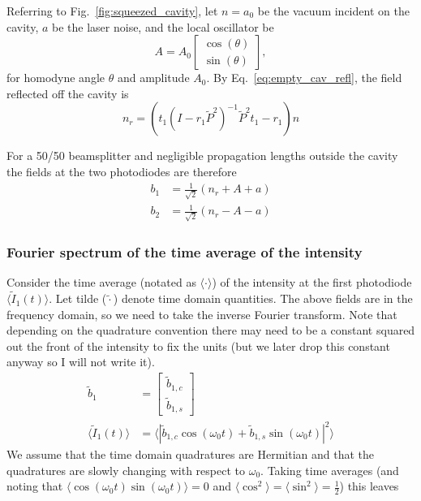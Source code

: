 \documentclass[aps,pra,superscriptaddress,reprint,nofootinbib]{revtex4-1}
\newcommand{\abs}[1]{\left\lvert #1 \right\rvert}
\newcommand{\expect}[1]{\langle #1 \rangle}
\begin{document}
Referring to Fig.~\ref{fig:squeezed_cavity}, let $n = a_0$ be the vacuum incident on the cavity, $a$ be the laser noise, and the local oscillator be
\begin{equation}
A = A_0 \begin{bmatrix}
\cos(\theta)\\ 
\sin(\theta)
\end{bmatrix},
\end{equation}
for homodyne angle $\theta$ and amplitude $A_0$. By Eq.~\ref{eq:empty_cav_refl}, the field reflected off the cavity is
\begin{equation}
n_r = \left(t_1 (I - r_1 \tilde{P}^2)^{-1} \tilde{P}^2 t_1 - r_1 \right) n
\end{equation}


For a 50/50 beamsplitter and negligible propagation lengths outside the cavity the fields at the two photodiodes are therefore
\begin{align}
b_1 &= \frac{1}{\sqrt{2}} \left( n_r + A + a\right) \\
b_2 &= \frac{1}{\sqrt{2}} \left( n_r - A - a\right)\nonumber
\end{align}

\subsubsection{Fourier spectrum of the time average of the intensity}

Consider the time average (notated as $\expect{\cdot}$) of the intensity at the first photodiode $\expect{\tilde{I}_1(t)}$. Let tilde ($\tilde{\cdot}$) denote time domain quantities. The above fields are in the frequency domain, so we need to take the inverse Fourier transform. Note that depending on the quadrature convention there may need to be a constant squared out the front of the intensity to fix the units (but we later drop this constant anyway so I will not write it). 
\begin{align}
\tilde{b}_1 &= \begin{bmatrix}
\tilde{b}_{1,c}\\ 
\tilde{b}_{1,s}
\end{bmatrix} \\
\expect{\tilde{I}_1(t)} &= \expect{\abs{\tilde{b}_{1,c} \cos(\omega_0 t) + \tilde{b}_{1,s} \sin(\omega_0 t)}^2}
\end{align}
We assume that the time domain quadratures are Hermitian and that the quadratures are slowly changing with respect to $\omega_0$. Taking time averages (and noting that $\expect{\cos(\omega_0 t) \sin(\omega_0 t)} = 0$ and $\expect{\cos^2} = \expect{\sin^2} = \frac{1}{2}$) this leaves
\end{document}
